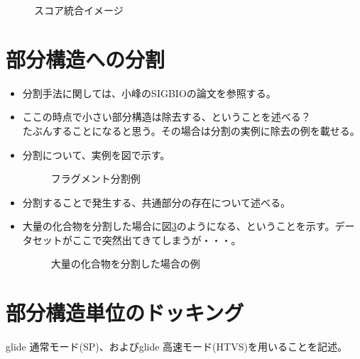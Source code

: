 \begin{figure}[htb]
 \begin{center}
  \caption{スコア統合イメージ}
  \label{fig:integration_image}
 \end{center}
\end{figure}

\section{部分構造への分割}

\begin{itemize}
\item 分割手法に関しては、小峰のSIGBIOの論文を参照する。\citetodo{}
\item ここの時点で小さい部分構造は除去する、ということを述べる？\\
たぶんすることになると思う。その場合は分割の実例に除去の例を載せる。
\item 分割について、実例を図で示す。

\begin{figure}[htp]
 \begin{center}
  \caption{フラグメント分割例}
  \label{fig:ex_decomposition}
 \end{center}
\end{figure}

\item 分割することで発生する、共通部分の存在について述べる。
\item 大量の化合物を分割した場合に図\ref{fig:decomposition_amount}のようになる、ということを示す。データセットがここで突然出てきてしまうが・・・。

\begin{figure}[htp]
 \begin{center}
  \caption{大量の化合物を分割した場合の例}
  \label{fig:decomposition_amount}
 \end{center}
\end{figure}

\end{itemize}

\section{部分構造単位のドッキング}
glide 通常モード(SP)、およびglide 高速モード(HTVS)を用いることを記述。


